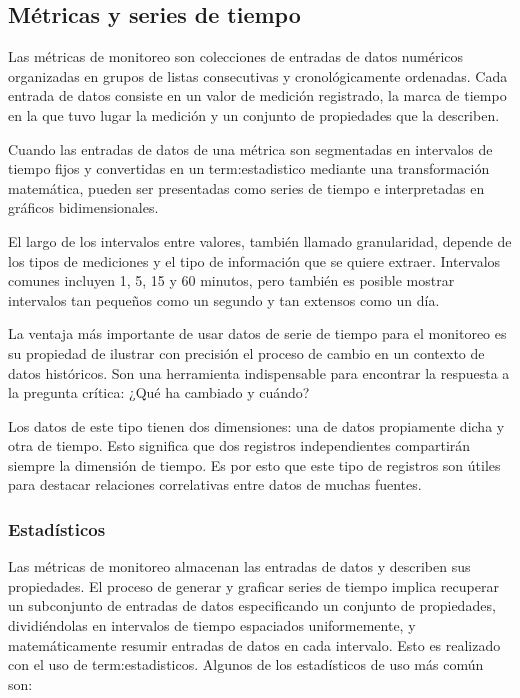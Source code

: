 \subsection{Métricas y series de tiempo}
\label{metricas-y-timeseries}

Las métricas de monitoreo son colecciones de entradas de datos numéricos
organizadas en grupos de listas consecutivas y cronológicamente ordenadas. Cada
entrada de datos consiste en un valor de medición registrado, la marca de
tiempo en la que tuvo lugar la medición y un conjunto de propiedades que la
describen.

Cuando las entradas de datos de una métrica son segmentadas en intervalos de
tiempo fijos y convertidas en un \gls{term:estadistico} mediante una
transformación matemática, pueden ser presentadas como series de tiempo e
interpretadas en gráficos bidimensionales.

El largo de los intervalos entre valores, también llamado granularidad, depende
de los tipos de mediciones y el tipo de información que se quiere extraer.
Intervalos comunes incluyen 1, 5, 15 y 60 minutos, pero también es posible
mostrar intervalos tan pequeños como un segundo y tan extensos como un día.

La ventaja más importante de usar datos de serie de tiempo para el monitoreo es
su propiedad de ilustrar con precisión el proceso de cambio en un contexto de
datos históricos. Son una herramienta indispensable para encontrar la respuesta
a la pregunta crítica: ¿Qué ha cambiado y cuándo?

Los datos de este tipo tienen dos dimensiones: una de datos propiamente dicha y
otra de tiempo. Esto significa que dos registros independientes compartirán
siempre la dimensión de tiempo. Es por esto que este tipo de registros son
útiles para destacar relaciones correlativas entre datos de muchas fuentes.

\subsubsection*{Estadísticos}
\label{estadisticos}

Las métricas de monitoreo almacenan las entradas de datos y describen sus
propiedades. El proceso de generar y graficar series de tiempo implica
recuperar un subconjunto de entradas de datos especificando un conjunto de
propiedades, dividiéndolas en intervalos de tiempo espaciados uniformemente, y
matemáticamente resumir entradas de datos en cada intervalo. Esto es realizado
con el uso de \glspl{term:estadistico}. Algunos de los estadísticos de uso más
común son:

